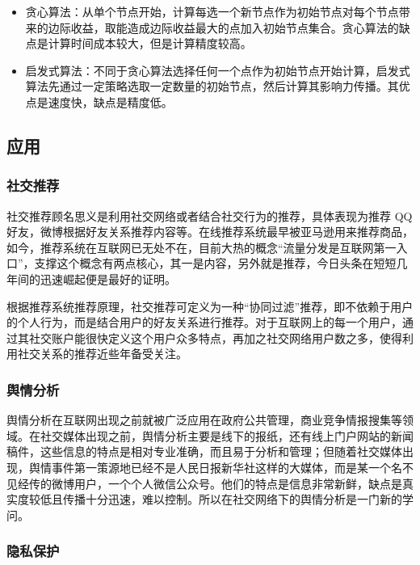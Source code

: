 \documentclass[12pt]{report}
\begin{document}
				\begin{itemize}
					\item 贪心算法：从单个节点开始，计算每选一个新节点作为初始节点对每个节点带来的边际收益，取能造成边际收益最大的点加入初始节点集合。贪心算法的缺点是计算时间成本较大，但是计算精度较高。
					\item 启发式算法：不同于贪心算法选择任何一个点作为初始节点开始计算，启发式算法先通过一定策略选取一定数量的初始节点，然后计算其影响力传播。其优点是速度快，缺点是精度低。
				\end{itemize}
		
		\subsection{应用}
			
			\subsubsection{社交推荐}
			
				社交推荐顾名思义是利用社交网络或者结合社交行为的推荐，具体表现为推荐 QQ 好友，微博根据好友关系推荐内容等。在线推荐系统最早被亚马逊用来推荐商品，如今，推荐系统在互联网已无处不在，目前大热的概念“流量分发是互联网第一入口”，支撑这个概念有两点核心，其一是内容，另外就是推荐，今日头条在短短几年间的迅速崛起便是最好的证明。
				
				根据推荐系统推荐原理，社交推荐可定义为一种“协同过滤”推荐，即不依赖于用户的个人行为，而是结合用户的好友关系进行推荐。对于互联网上的每一个用户，通过其社交账户能很快定义这个用户众多特点，再加之社交网络用户数之多，使得利用社交关系的推荐近些年备受关注。
				
			\subsubsection{舆情分析}
			
				舆情分析在互联网出现之前就被广泛应用在政府公共管理，商业竞争情报搜集等领域。在社交媒体出现之前，舆情分析主要是线下的报纸，还有线上门户网站的新闻稿件，这些信息的特点是相对专业准确，而且易于分析和管理；但随着社交媒体出现，舆情事件第一策源地已经不是人民日报新华社这样的大媒体，而是某一个名不见经传的微博用户，一个个人微信公众号。他们的特点是信息非常新鲜，缺点是真实度较低且传播十分迅速，难以控制。所以在社交网络下的舆情分析是一门新的学问。
			
			\subsubsection{隐私保护}
			
\end{document}

